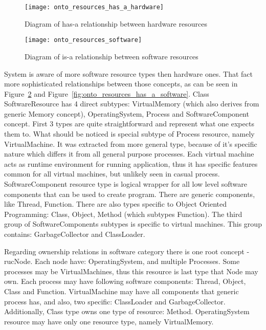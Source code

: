 \begin{figure}[ht]
  \centering
  \texttt{[image: onto\_resources\_has\_a\_hardware]}
  \caption{Diagram of has-a relationship between hardware resources}
  \label{fig:onto_resources_has_a_hardware}
\end{figure}


\begin{figure}[ht]
  \centering
  \texttt{[image: onto\_resources\_software]}
  \caption{Diagram of is-a relationship between software resources}
  \label{fig:onto_resources_software}
\end{figure}

System is aware of more software resource types then hardware ones. That fact more sophisticated relationships between
those concepts, as can be seen in Figure~\ref{fig:onto_resources_software}
and Figure~\ref{fig:onto_resources_has_a_software}. Class SoftwareResource has 4 direct subtypes: VirtualMemory (which
also derives from generic Memory concept), OperatingSystem, Process and SoftwareComponent concept. First 3 types are
quite straightforward and represent what one expects them to.
What should be noticed is special subtype of Process resource, namely VirtualMachine. It was extracted from more
general type, because of it's specific nature which differs it from all general purpose processes. Each virtual
machine acts as runtime environment for running application, thus it has specific features common for all virtual
machines, but unlikely seen in casual process.
SoftwareComponent resource type is logical wrapper for all low level software components that can be used to create
program. There are generic components, like Thread, Function. There are also types specific to Object Oriented
Programming: Class, Object, Method (which subtypes Function). The third group of SoftwareComponents subtypes is specific
to virtual machines. This group contains: GarbageCollector and ClassLoader.

\pagebreak
Regarding ownership relations in software category there is one root concept - rucNode. Each node have: OperatingSystem,
and multiple Processes. Some processes may be VirtualMachines, thus this resource is last type that Node may own.
Each process may have following software components: Thread, Object, Class and Function. VirtualMachine may have
all components that generic process has, and also, two specific: ClassLoader and GarbageCollector. Additionally, Class
type owns one type of resource: Method. 
OperatingSystem resource may have only one resource type, namely VirtualMemory.


